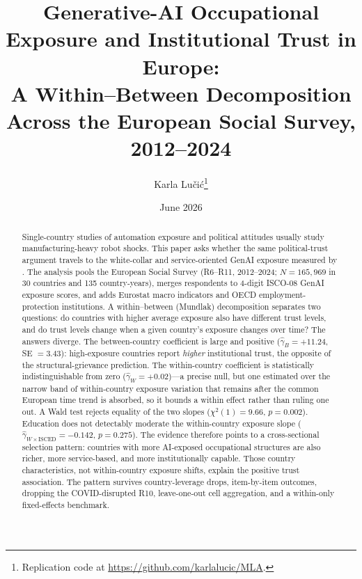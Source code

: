 \documentclass[11pt,a4paper]{article}
\title{\textbf{Generative-AI Occupational Exposure and Institutional
Trust in Europe:\\
A Within--Between Decomposition Across the European Social Survey,
2012--2024}}
\author{Karla Lučić\thanks{Replication code at \url{https://github.com/karlalucic/MLA}.}}
\date{June 2026}
\begin{document}
\maketitle

\begin{abstract}\noindent
Single-country studies of automation exposure and political attitudes
usually study manufacturing-heavy robot shocks. This paper asks
whether the same political-trust argument travels to the
white-collar and service-oriented GenAI exposure measured by
\citet{Gmyrek2025}. The analysis pools the European Social Survey
(R6--R11, 2012--2024; $N=165{,}969$ in 30 countries and 135
country-years), merges respondents to 4-digit ISCO-08 GenAI exposure
scores, and adds Eurostat macro indicators and OECD
employment-protection institutions. A within--between (Mundlak)
decomposition
\citep{Mundlak1978,BellJones2015,SchmidtCatranFairbrother2016}
separates two questions: do countries with higher average exposure
also have different trust levels, and do trust levels change when a
given country's exposure changes over time? The answers diverge.
The between-country coefficient is large and positive
($\hat\gamma_B = +11.24$, SE $=3.43$): high-exposure countries report
\emph{higher} institutional trust, the opposite of the
structural-grievance prediction. The within-country coefficient is
statistically indistinguishable from zero ($\hat\gamma_W = +0.02$)---a
precise null, but one estimated over the narrow band of within-country
exposure variation that remains after the common European time trend is
absorbed, so it bounds a within effect rather than ruling one out.
A Wald test rejects equality of the two slopes
($\chi^2(1)=9.66$, $p=0.002$). Education does not detectably
moderate the within-country exposure slope
($\hat{\gamma}_{W \times \mathrm{ISCED}} = -0.142$, $p=0.275$).
The evidence therefore points to a cross-sectional selection pattern:
countries with more AI-exposed occupational structures are also
richer, more service-based, and more institutionally capable. Those
country characteristics, not within-country exposure shifts, explain
the positive trust association. The pattern survives country-leverage
drops, item-by-item outcomes, dropping the COVID-disrupted R10,
leave-one-out cell aggregation, and a within-only fixed-effects
benchmark.
\end{abstract}









\end{document}

